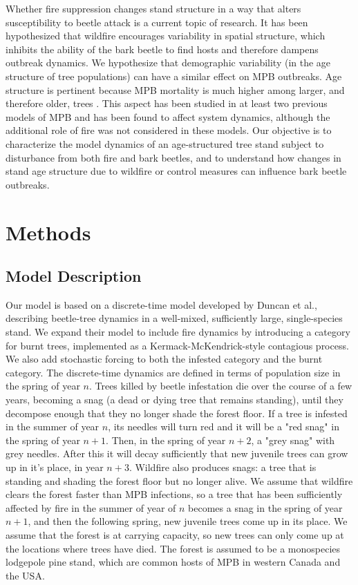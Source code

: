 Whether fire suppression changes stand structure in a way that alters susceptibility to beetle attack is a current topic of research.  It has been hypothesized that wildfire encourages variability in spatial structure\cite{seidl2016spatial}, which inhibits the ability of the bark beetle to find hosts and therefore dampens outbreak dynamics. We hypothesize that demographic variability (in the age structure of tree populations) can have a similar effect on MPB outbreaks. Age structure is pertinent because MPB mortality is much higher among larger, and therefore older, trees \cite{axelson2010changes,safranyik2003mountain}. This aspect has been studied in at least two previous models of MPB \cite{lewis2010structured,duncan2015model} and has been found to affect system dynamics, although the additional role of fire was not considered in these models. Our objective is to characterize the model dynamics of an age-structured tree stand subject to disturbance from both fire and bark beetles, and to understand how changes in stand age structure due to wildfire or control measures can influence bark beetle outbreaks. 


\section{Methods}

\subsection{Model Description}

Our model is based on a discrete-time model developed by Duncan et al.\cite{duncan2015model}, describing beetle-tree dynamics in a well-mixed, sufficiently large, single-species stand. We expand their model to include fire dynamics by introducing a category for burnt trees, implemented as a Kermack-McKendrick-style contagious process\cite{edelstein1988mathematical}. We also add stochastic forcing to both the infested category and the burnt category. The discrete-time dynamics are defined in terms of population size in the spring of year $n$. Trees killed by beetle infestation die over the course of a few years, becoming a snag (a dead or dying tree that remains standing), until they decompose enough that they no longer shade the forest floor. If a tree is infested in the summer of year $n$, its needles will turn red and it will be a "red snag" in the spring of year $n+1$. Then, in the spring of year $n+2$, a "grey snag" with grey needles. After this it will decay sufficiently that new juvenile trees can grow up in it's place, in year $n+3$. Wildfire also produces snags: a tree that is standing and shading the forest floor but no longer alive. We assume that wildfire clears the forest faster than MPB infections, so a tree that has been sufficiently affected by fire in the summer of year of $n$ becomes a snag in the spring of year $n+1$, and then the following spring, new juvenile trees come up in its place.  {We assume that the forest is at carrying capacity, so new trees can only come up at the locations where trees have died. The forest is assumed to be a monospecies lodgepole pine stand, which are common hosts of MPB in western Canada and the USA.}


